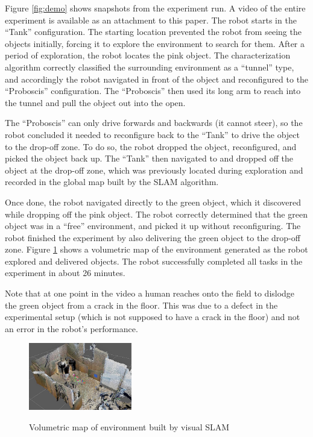 \documentclass[conference]{IEEEtran}
\begin{document}
%
Figure \ref{fig:demo} shows snapshots from the experiment run. A video of the entire experiment is available as an attachment to this paper. The robot starts in the ``Tank'' configuration. The starting location prevented the robot from seeing the objects initially, forcing it to explore the environment to search for them. After a period of exploration, the robot locates the pink object. The characterization algorithm correctly classified the surrounding environment as a ``tunnel'' type, and accordingly the robot navigated in front of the object and reconfigured to the ``Proboscis'' configuration. The ``Proboscis'' then used its long arm to reach into the tunnel and pull the object out into the open.

 The ``Proboscis'' can only drive forwards and backwards (it cannot steer), so the robot concluded it needed to reconfigure back to the ``Tank'' to drive the object to the drop-off zone.  To do so, the robot dropped the object,  reconfigured, and picked the object back up. The ``Tank'' then navigated to and dropped off the object at the drop-off zone, which was previously located during exploration and recorded in the global map built by the SLAM algorithm.

 Once done, the robot navigated directly to the green object, which it discovered while dropping off the pink object. The robot correctly determined
that the green object was in a ``free'' environment, and picked it up without reconfiguring. The robot finished the experiment by also delivering the green object to the drop-off zone. Figure \ref{fig:octomap} shows a volumetric map of the environment generated as the robot explored and delivered objects. The robot successfully completed all tasks in the experiment in about 26 minutes. 

Note that at one point in the video a human reaches onto the field to dislodge the green object from a crack in the floor.  This was due to a defect in the experimental setup (which is not supposed to have a crack in the floor) and not an error in the robot's performance.
%
\begin{figure}
\begin{center}
\includegraphics[width=0.4\textwidth]{images/map4.jpg}
\caption{Volumetric map of environment built by visual SLAM}
\vspace{-2em}
\label{fig:octomap}
\end{center}
\end{figure}
\end{document}
